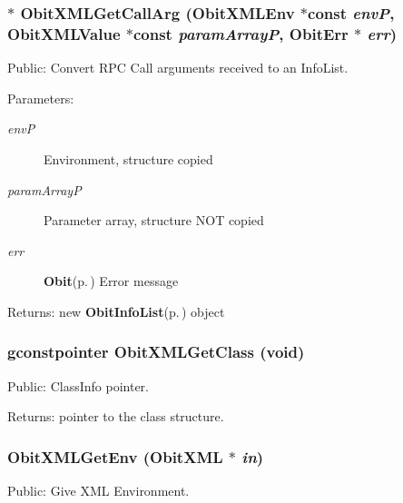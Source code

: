 \subsubsection{$\ast$ Obit\-XMLGet\-Call\-Arg ({\bf Obit\-XMLEnv} $\ast$const  {\em env\-P}, {\bf Obit\-XMLValue} $\ast$const  {\em param\-Array\-P}, {\bf Obit\-Err} $\ast$ {\em err})}\label{ObitXML_8h_a18}


Public: Convert RPC Call arguments received to an Info\-List. 

\begin{Desc}
\item[Parameters:]
\begin{description}
\item[{\em env\-P}]Environment, structure copied \item[{\em param\-Array\-P}]Parameter array, structure NOT copied \item[{\em err}]{\bf Obit}{\rm (p.\,\pageref{structObit})} Error message \end{description}
\end{Desc}
\begin{Desc}
\item[Returns:]new {\bf Obit\-Info\-List}{\rm (p.\,\pageref{structObitInfoList})} object \end{Desc}
\subsubsection{\setlength{\rightskip}{0pt plus 5cm}gconstpointer Obit\-XMLGet\-Class (void)}\label{ObitXML_8h_a16}


Public: Class\-Info pointer. 

\begin{Desc}
\item[Returns:]pointer to the class structure. \end{Desc}
\subsubsection{ Obit\-XMLGet\-Env ({\bf Obit\-XML} $\ast$ {\em in})}\label{ObitXML_8h_a19}


Public: Give XML Environment. 

